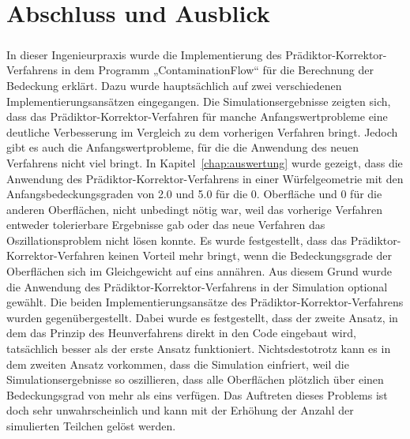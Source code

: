 \documentclass{listhesis}
\begin{document}

\chapter{Abschluss und Ausblick} \label{chap:abschluss}
\paragraph{}
In dieser Ingenieurpraxis wurde die Implementierung des Prädiktor-Korrektor-Verfahrens in dem Programm „ContaminationFlow“ für die Berechnung der Bedeckung erklärt. Dazu wurde hauptsächlich auf zwei verschiedenen Implementierungsansätzen eingegangen. Die Simulationsergebnisse zeigten sich, dass das Prädiktor-Korrektor-Verfahren für manche Anfangswertprobleme eine deutliche Verbesserung im Vergleich zu dem vorherigen Verfahren bringt. Jedoch gibt es auch die Anfangswertprobleme, für die die Anwendung des neuen Verfahrens nicht viel bringt. In Kapitel~\ref{chap:auswertung} wurde gezeigt, dass die Anwendung des Prädiktor-Korrektor-Verfahrens in einer Würfelgeometrie mit den Anfangsbedeckungsgraden von 2.0 und 5.0 für die  0. Oberfläche und 0 für die anderen Oberflächen, nicht unbedingt nötig war, weil das vorherige Verfahren entweder tolerierbare Ergebnisse gab oder das neue Verfahren das Oszillationsproblem nicht lösen konnte. Es wurde festgestellt, dass das Prädiktor-Korrektor-Verfahren keinen Vorteil mehr bringt, wenn die Bedeckungsgrade der Oberflächen sich im Gleichgewicht auf eins annähren. Aus diesem Grund wurde die Anwendung des Prädiktor-Korrektor-Verfahrens in der Simulation optional gewählt. Die beiden Implementierungsansätze des Prädiktor-Korrektor-Verfahrens wurden gegenübergestellt. Dabei wurde es festgestellt, dass der zweite Ansatz, in dem das Prinzip des Heunverfahrens direkt in den Code eingebaut wird, tatsächlich besser als der erste Ansatz funktioniert. Nichtsdestotrotz kann es in dem zweiten Ansatz vorkommen, dass die Simulation einfriert, weil die Simulationsergebnisse so oszillieren, dass alle Oberflächen plötzlich über einen Bedeckungsgrad von mehr als eins verfügen. Das Auftreten dieses Problems ist doch sehr unwahrscheinlich und kann mit der Erhöhung der Anzahl der simulierten Teilchen gelöst werden.
\end{document}
